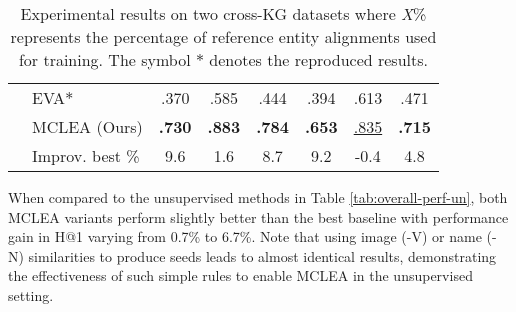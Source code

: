 \documentclass[11pt]{article}
\begin{document}
\begin{table}[ht]
\begin{tabular}{@{}l|l|ccc|ccc@{}}
        & EVA$\ast$ & .370 & .585 & .444 & .394 & .613 & .471 \\
        & MCLEA {\tiny(Ours)} & \textbf{.730} & \textbf{.883} & \textbf{.784} & \textbf{.653} & \underline{.835} & \textbf{.715} \\
\cmidrule(lr){2-8}
        & Improv. best \% & 
        9.6 & 1.6 & 8.7 & 9.2 & -0.4 & 4.8 \\
        \bottomrule
    \end{tabular}
    \caption{Experimental results on two cross-KG datasets where \textit{X}\% represents the percentage of reference entity alignments used for training. The symbol $\ast$ denotes the reproduced results.
    }
    \label{tab:overall-perf-2}
\end{table}

When compared to the unsupervised methods in Table \ref{tab:overall-perf-un}, both MCLEA variants perform slightly better than the best baseline with performance gain in H@1 varying from 0.7\% to 6.7\%.
Note that using image (-V) or name (-N) similarities to produce seeds leads to almost identical results, demonstrating the effectiveness of such simple rules to enable MCLEA in the unsupervised setting.
\end{document}
